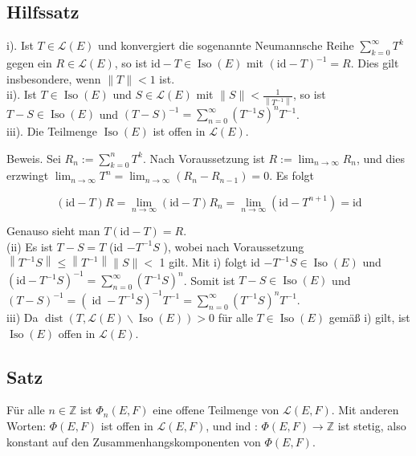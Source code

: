 \documentclass[10pt, letterpaper]{article}
\begin{document}
\subsection*{Hilfssatz}
i). Ist $T \in \mathcal{L}(E)$ und konvergiert die sogenannte Neumannsche Reihe $\sum_{k=0}^{\infty} T^{k}$ gegen ein $R \in \mathcal{L}(E)$, so ist $\mathrm{id}-T \in \operatorname{Iso}(E)$ mit $(\mathrm{id}-T)^{-1}=R$. Dies gilt insbesondere, wenn $\|T\|<1$ ist.\\
ii). Ist $T \in \operatorname{Iso}(E)$ und $S \in \mathcal{L}(E)$ mit $\|S\|<\frac{1}{\left\|T^{-1}\right\|}$, so ist $T-S \in \operatorname{Iso}(E)$ und $(T-S)^{-1}=\sum_{n=0}^{\infty}\left(T^{-1} S\right)^{n} T^{-1}$.\\
iii). Die Teilmenge $\operatorname{Iso}(E)$ ist offen in $\mathcal{L}(E)$.

Beweis. Sei $R_{n}:=\sum_{k=0}^{n} T^{k}$. Nach Voraussetzung ist $R:=\lim _{n \rightarrow \infty} R_{n}$, und dies erzwingt $\lim _{n \rightarrow \infty} T^{n}=\lim _{n \rightarrow \infty}\left(R_{n}-R_{n-1}\right)=0$. Es folgt

$$
(\mathrm{id}-T) R=\lim _{n \rightarrow \infty}(\mathrm{id}-T) R_{n}=\lim _{n \rightarrow \infty}\left(\mathrm{id}-T^{n+1}\right)=\mathrm{id}
$$

Genauso sieht man $T(\mathrm{id}-T)=R$.\\
(ii) Es ist $T-S=T$ (id $-T^{-1} S$ ), wobei nach Voraussetzung $\left\|T^{-1} S\right\| \leq\left\|T^{-1}\right\|\|S\|<$ 1 gilt. Mit i) folgt id $-T^{-1} S \in \operatorname{Iso}(E)$ und $\left(\mathrm{id}-T^{-1} S\right)^{-1}=\sum_{n=0}^{\infty}\left(T^{-1} S\right)^{n}$. Somit ist $T-S \in \operatorname{Iso}(E)$ und $(T-S)^{-1}=\left(\operatorname{id}-T^{-1} S\right)^{-1} T^{-1}=\sum_{n=0}^{\infty}\left(T^{-1} S\right)^{n} T^{-1}$.\\
iii) Da $\operatorname{dist}(T, \mathcal{L}(E) \backslash \operatorname{Iso}(E))>0$ für alle $T \in \operatorname{Iso}(E)$ gemäß i) gilt, ist $\operatorname{Iso}(E)$ offen in $\mathcal{L}(E)$.

\subsection*{Satz}
Für alle $n \in \mathbb{Z}$ ist $\Phi_{n}(E, F)$ eine offene Teilmenge von $\mathcal{L}(E, F)$. Mit anderen Worten: $\Phi(E, F)$ ist offen in $\mathcal{L}(E, F)$, und ind : $\Phi(E, F) \rightarrow \mathbb{Z}$ ist stetig, also konstant auf den Zusammenhangskomponenten von $\Phi(E, F)$.
\end{document}
